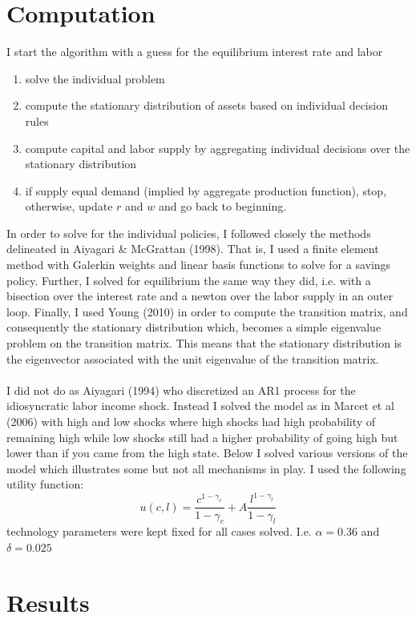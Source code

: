 \documentclass{article} %
\begin{document}
\section*{Computation}
I start the algorithm with a guess for the equilibrium interest rate and labor
\begin{enumerate}
\item solve the individual problem
\item compute the stationary distribution of assets based on individual decision rules
\item compute capital and labor supply by aggregating individual decisions over the stationary distribution
\item if supply equal demand (implied by aggregate production function), stop, otherwise, update $r$ and $w$ and go back to beginning.
\end{enumerate}
In order to solve for the individual policies, I followed closely the methods delineated in Aiyagari \& McGrattan (1998). That is, I used a finite element method with Galerkin weights and linear basis functions to solve for a savings policy. Further, I solved for equilibrium the same way they did, i.e. with a bisection over the interest rate and a newton over the labor supply in an outer loop. Finally, I used Young (2010) in order to compute the transition matrix, and consequently the stationary distribution which, becomes a simple eigenvalue problem on the transition matrix. This means that the stationary distribution is the eigenvector associated with the unit eigenvalue of the transition matrix.\\
\\
I did not do as Aiyagari (1994) who discretized an AR1 process for the idiosyncratic labor income shock. Instead I solved the model as in Marcet et al (2006) with high and low shocks where high shocks had high probability of remaining high while low shocks still had a higher probability of going high but lower than if you came from the high state. Below I solved various versions of the model which illustrates some but not all mechanisms in play. I used the following utility function:
$$u(c,l) = \frac{c^{1-\gamma_c}}{1-\gamma_c} + A\frac{l^{1-\gamma_l}}{1-\gamma_l}$$
technology parameters were kept fixed for all cases solved. I.e. $\alpha = 0.36$ and $\delta = 0.025$
\section*{Results}
\end{document}
